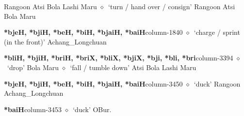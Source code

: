 \hspace{1ex}
         Rangoon 
\hspace{1ex}
         Atsi 
\hspace{1ex}
         Bola 
\hspace{1ex}
         Lashi 
\hspace{1ex}
         Maru 
\hspace{1ex}
         $\diamond$~`turn / hand over / consign'
         Rangoon 
\hspace{1ex}
         Atsi 
\hspace{1ex}
         Bola 
\hspace{1ex}
         Maru 
  \item {\footnotesize \textbf{*bjeH, *bjiH, *beH, *biH, *bjaiH, *baiH}}{\tiny column-1840}
         $\diamond$~`charge / sprint (in the front)'
         Achang\_Longchuan 
  \item {\footnotesize \textbf{*bliH, *bjiH, *briH, *briX, *bliX, *bjiX, *bji, *bli, *bri}}{\tiny column-3394}
         $\diamond$~`drop'
         Bola 
\hspace{1ex}
         Maru 
\hspace{1ex}
         $\diamond$~`fall / tumble down'
         Atsi 
\hspace{1ex}
         Bola 
\hspace{1ex}
         Lashi 
\hspace{1ex}
         Maru 
  \item {\footnotesize \textbf{*bjeH, *bjiH, *beH, *biH, *bjaiH, *baiH}}{\tiny column-3450}
         $\diamond$~`duck'
         Rangoon 
\hspace{1ex}
         Achang\_Longchuan 
  \item {\footnotesize \textbf{*baiH}}{\tiny column-3453}
         $\diamond$~`duck'
         OBur. 
